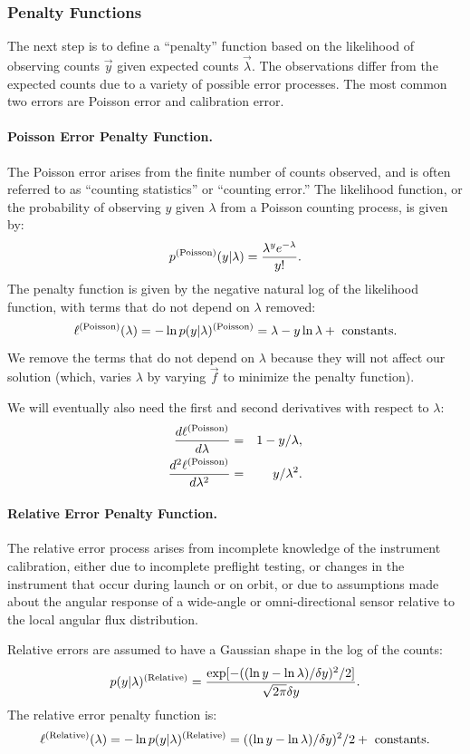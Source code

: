 \documentclass{article}    %
\newcommand{\subsubsubsection}[1]{\paragraph{#1.}}
\begin{document}
\subsubsection{Penalty Functions}

The next step is to define a ``penalty'' function based on the
likelihood of observing counts $\vec{y}$ given expected counts
$\vec{\lambda}$. The observations differ from the expected counts due
to a variety of possible error processes. The most common two errors
are Poisson error and calibration error. 

\subsubsubsection{Poisson Error Penalty Function}

The Poisson error arises from the finite number of counts observed,
and is often referred to as ``counting statistics'' or ``counting
error.'' The likelihood function, or the probability of observing $y$
given $\lambda$ from a Poisson counting process, is given by:
\begin{equation}
p^{\rm (Poisson)}(y|\lambda) = \frac{\lambda^y e^{-\lambda}}{y!}.
\end{equation}
The penalty function is given by the negative natural log of the
likelihood function, with terms that do not depend on $\lambda$ removed:
\begin{equation}
\ell^{\rm (Poisson)}(\lambda) = -\ln p(y|\lambda)^{\rm (Poisson)} = \lambda-y\ln\lambda + {\rm ~ constants}.
\end{equation}
We remove the terms that do not depend on $\lambda$ because they will
not affect our solution (which, varies $\lambda$ by varying $\vec{f}$
to minimize the penalty function).

We will eventually also need the first and second derivatives with respect to $\lambda$:
\begin{eqnarray}
\frac{d \ell^{\rm (Poisson)}}{d \lambda} &=& 1-y/\lambda, \\
\frac{d^2 \ell^{\rm (Poisson)}}{d \lambda^2} &=& y/\lambda^2.
\end{eqnarray}

\subsubsubsection{Relative Error Penalty Function}

The relative error process arises from incomplete knowledge of the
instrument calibration, either due to incomplete preflight testing, or
changes in the instrument that occur during launch or on orbit, or due
to assumptions made about the angular response of a wide-angle or
omni-directional sensor relative to the local angular flux
distribution.

Relative errors are assumed to have a Gaussian shape in the
log of the counts:
\begin{equation}
p(y|\lambda)^{\rm (Relative)} = \frac{\exp[ -((\ln y-\ln\lambda)/\delta y)^2/2 ]}{\sqrt{2\pi}\delta y}.
\end{equation}
The relative error penalty function is:
\begin{equation}
\ell^{\rm (Relative)}(\lambda) = -\ln p(y|\lambda)^{\rm (Relative)} = ((\ln y-\ln\lambda)/\delta y)^2/2 + {\rm ~ constants}.
\end{equation}
\end{document}
